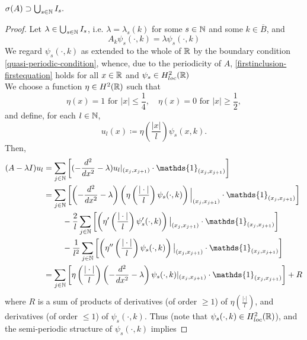 \begin{theorem} \label{4.1:thm-MainResult.FirstInclusion}
	$\sigma(A) \supset \bigcup_{s \in \mathbb{N}} I_{s}.$
	
	\begin{proof}
		Let $\lambda \in \bigcup_{s \in \mathbb{N}} I_{s}$, i.e. $\lambda = \lambda_{s}(k)$ for some $s \in \mathbb{N}$ and some $k \in \overline{B}$, and 
		\begin{equation}
			A_{k} \psi_{s}(\cdot, k) = \lambda \psi_{s}(\cdot, k) \label{firstinclusion-firstequation} %
		\end{equation}
		We regard $\psi_{s}(\cdot, k)$ as extended to the whole of $\mathbb{R}$ by the boundary condition \eqref{quasi-periodic-condition}, whence, due to the periodicity of $A$, \eqref{firstinclusion-firstequation} holds for all $x \in \mathbb{R}$ and $\psi_{s} \in H^{2}_{loc}(\mathbb{R})$ \\
		We choose a function $\eta \in H^{2}(\mathbb{R})$ such that
			\[ \eta(x) = 1 \text{ for } |x| \leq \frac{1}{4}, \quad \eta(x) = 0 \text{ for } |x| \geq \frac{1}{2}, \]
		and define, for each $l \in \mathbb{N}$,
			\[ u_{l}(x) \coloneqq \eta\left(\frac{|x|}{l}\right) \psi_{s}(x, k). \]
	 	Then,
		\begin{align}
			(A - \lambda I) u_{l} & = \sum_{j \in \N} \left[ (- \frac{d^{2}}{dx^{2}} - \lambda) u_{l}|_{(x_{j}, x_{j+1})} \cdot \mathds{1}_{(x_{j}, x_{j+1})} \right] \label{eq:sepofspectraleq} \\
				& = \sum_{j \in \N} \left[ \left(- \frac{d^{2}}{dx^{2}} - \lambda \right) \left( \eta\left(\frac{|\cdot|}{l}\right) \psi_{s}(\cdot, k) \right)\Big|_{(x_{j}, x_{j+1})} \cdot \mathds{1}_{(x_{j}, x_{j+1})} \right] \notag \\
				& ~\qquad - \frac{2}{l} \sum_{j \in \N} \left[ \left( \eta'\left(\frac{|\cdot|}{l}\right) \psi_{s}'(\cdot, k) \right)\big|_{(x_{j}, x_{j+1})} \cdot \mathds{1}_{(x_{j}, x_{j+1})}  \right] \notag \\
				& ~\qquad - \frac{1}{l^{2}} \sum_{j \in \N} \left[ \left( \eta''\left(\frac{|\cdot|}{l}\right) \psi_{s}(\cdot, k) \right)\big|_{(x_{j}, x_{j+1})} \cdot \mathds{1}_{(x_{j}, x_{j+1})} \right] \notag \\
				& = \sum_{j \in \N} \left[ \eta\left(\frac{|\cdot|}{l}\right) \left(- \frac{d^{2}}{dx^{2}} - \lambda \right) \psi_{s}(\cdot, k) |_{(x_{j}, x_{j+1})} \cdot \mathds{1}_{(x_{j}, x_{j+1})} \right] + R \notag
		\end{align}
		where $R$ is a sum of products of derivatives (of order $\geq 1$) of $\eta(\frac{|\cdot|}{l})$, and derivatives (of order $\leq 1$) of $\psi_{s}(\cdot, k)$. Thus (note that $\psi_{s}(\cdot, k) \in H^{2}_{loc}(\mathbb{R})$), and the semi-periodic structure of $\psi_{s}(\cdot, k)$ implies

\end{proof}
\end{theorem}
